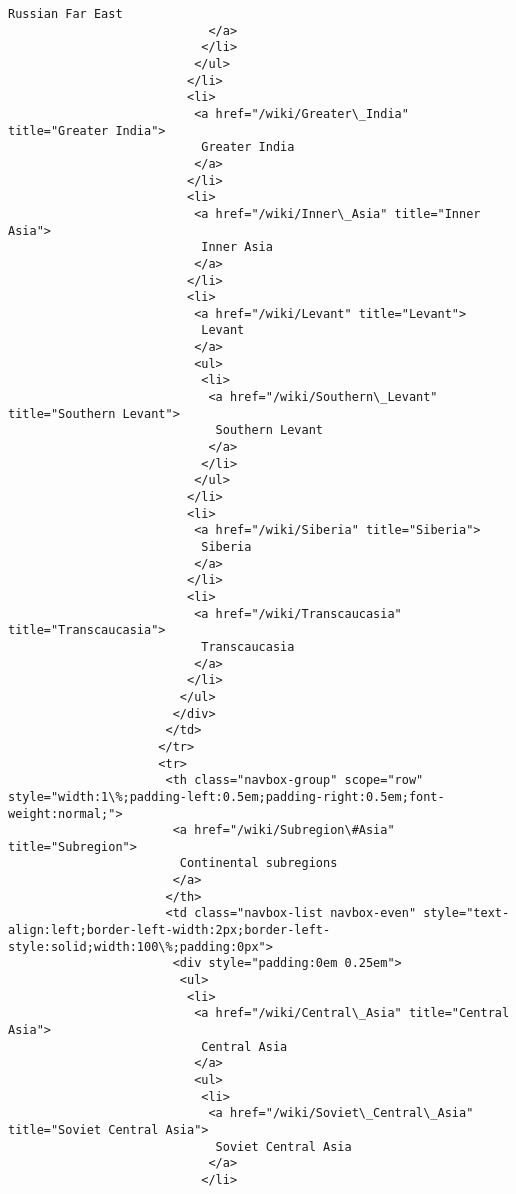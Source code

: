 \documentclass[11pt]{article}
\begin{document}
\begin{Verbatim}[commandchars=\\\{\}]
                             Russian Far East
                            </a>
                           </li>
                          </ul>
                         </li>
                         <li>
                          <a href="/wiki/Greater\_India" title="Greater India">
                           Greater India
                          </a>
                         </li>
                         <li>
                          <a href="/wiki/Inner\_Asia" title="Inner Asia">
                           Inner Asia
                          </a>
                         </li>
                         <li>
                          <a href="/wiki/Levant" title="Levant">
                           Levant
                          </a>
                          <ul>
                           <li>
                            <a href="/wiki/Southern\_Levant" title="Southern Levant">
                             Southern Levant
                            </a>
                           </li>
                          </ul>
                         </li>
                         <li>
                          <a href="/wiki/Siberia" title="Siberia">
                           Siberia
                          </a>
                         </li>
                         <li>
                          <a href="/wiki/Transcaucasia" title="Transcaucasia">
                           Transcaucasia
                          </a>
                         </li>
                        </ul>
                       </div>
                      </td>
                     </tr>
                     <tr>
                      <th class="navbox-group" scope="row" style="width:1\%;padding-left:0.5em;padding-right:0.5em;font-weight:normal;">
                       <a href="/wiki/Subregion\#Asia" title="Subregion">
                        Continental subregions
                       </a>
                      </th>
                      <td class="navbox-list navbox-even" style="text-align:left;border-left-width:2px;border-left-style:solid;width:100\%;padding:0px">
                       <div style="padding:0em 0.25em">
                        <ul>
                         <li>
                          <a href="/wiki/Central\_Asia" title="Central Asia">
                           Central Asia
                          </a>
                          <ul>
                           <li>
                            <a href="/wiki/Soviet\_Central\_Asia" title="Soviet Central Asia">
                             Soviet Central Asia
                            </a>
                           </li>

\end{Verbatim}
\end{document}
